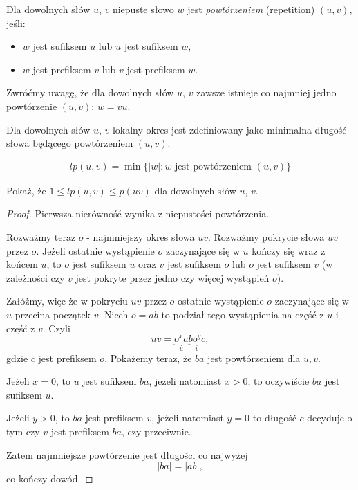 \begin{definition}{}{}
  Dla dowolnych słów $u$, $v$ niepuste słowo $w$ jest \emph{powtórzeniem} (repetition) $(u, v)$, jeśli:
  \begin{itemize}
    \item $w$ jest sufiksem $u$ lub $u$ jest sufiksem $w$,
    \item $w$ jest prefiksem $v$ lub $v$ jest prefiksem $w$.
  \end{itemize}
\end{definition}
Zwróćmy uwagę, że dla dowolnych słów $u$, $v$ zawsze istnieje co najmniej jedno powtórzenie $(u, v)$: $w = vu$.

\begin{definition}{}{}
  Dla dowolnych słów $u$, $v$ lokalny okres jest zdefiniowany jako minimalna długość słowa będącego powtórzeniem $(u, v)$.

  \begin{align*}
    lp(u, v) = \min\{|w|: \text{$w$ jest powtórzeniem $(u, v)$}\}
  \end{align*}
\end{definition}

\begin{problem}{}{}
  Pokaż, że $1 \le lp(u, v) \le p(uv)$ dla dowolnych słów $u$, $v$.
\end{problem}

\begin{proof}
Pierwsza nierówność wynika z niepustości powtórzenia. 

Rozważmy teraz $o$ - najmniejszy okres słowa $uv$. Rozważmy pokrycie słowa $uv$ przez $o$. Jeżeli ostatnie wystąpienie $o$ zaczynające się w $u$ kończy się wraz z końcem $u$, to $o$ jest sufiksem $u$ oraz $v$ jest sufiksem $o$ lub $o$ jest sufiksem $v$ (w zależności czy $v$ jest pokryte przez jedno czy więcej wystąpień $o$).

Załóżmy, więc że w pokryciu $uv$ przez $o$ ostatnie wystąpienie $o$ zaczynające się w $u$ przecina początek $v$. Niech $o=ab$ to podział tego wystąpienia na część z $u$ i część z $v$. Czyli 
$$uv = \underbrace{o^{x} a}_{u} \underbrace{b o^{y} c}_{v},$$
gdzie $c$ jest prefiksem $o$.
Pokażemy teraz, że $ba$ jest powtórzeniem dla $u, v$.

Jeżeli $x=0$, to $u$ jest sufiksem $ba$, jeżeli natomiast $x>0$, to oczywiście $ba$ jest sufiksem $u$.
 
Jeżeli $y>0$, to $ba$ jest prefiksem $v$, jeżeli natomiast $y=0$ to długość $c$ decyduje o tym czy $v$ jest prefiksem $ba$, czy przeciwnie. 
 
Zatem najmniejsze powtórzenie jest długości co najwyżej 
$$|ba| = |ab|,$$
co kończy dowód.
\end{proof}

